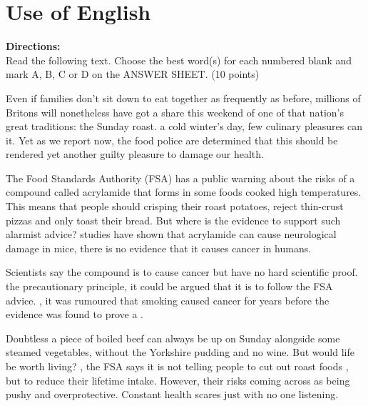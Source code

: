 




\section{Use of English}

\noindent
\textbf{Directions:}\\
Read the following text. Choose the best word(s) for each numbered blank
and mark A, B, C or D on the ANSWER SHEET. (10 points)



\TiGanSpace


Even if families don't sit down to eat together as frequently as before,
millions of Britons will nonetheless have got a share this weekend of
one of that nation's great traditions: the Sunday roast. \cloze a
cold winter's day, few culinary pleasures can \cloze it. Yet as
we report now, the food police are determined that this \cloze
should be rendered yet another guilty pleasure \cloze to damage
our health.

The Food Standards Authority (FSA) has \cloze a public warning
about the risks of a compound called acrylamide that forms in some foods
cooked \cloze high temperatures. This means that people should
\cloze crisping their roast potatoes, reject thin-crust pizzas
and only \cloze toast their bread. But where is the evidence to
support such alarmist advice? \cloze studies have shown that
acrylamide can cause neurological damage in mice, there is no
\cloze evidence that it causes cancer in humans.

Scientists say the compound is \cloze to cause cancer but have
no hard scientific proof. \cloze the precautionary principle, it
could be argued that it is \cloze to follow the FSA advice.
\cloze , it was rumoured that smoking caused cancer for years
before the evidence was found to prove a \cloze.

Doubtless a piece of boiled beef can always be \cloze up on
Sunday alongside some steamed vegetables, without the Yorkshire pudding
and no wine. But would life be worth living? \cloze , the FSA
says it is not telling people to cut out roast foods \cloze , but
to reduce their lifetime intake. However, their \cloze risks
coming across as being pushy and overprotective. Constant health scares
just \cloze with no one listening.

